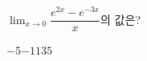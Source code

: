 $\displaystyle\lim_{x\to 0}\dfrac{e^{2x}-e^{-3x}}{x}$의 값은?
\begin{choices32}{$-5$}{$-1$}{$1$}{$3$}{$5$}\end{choices32}
